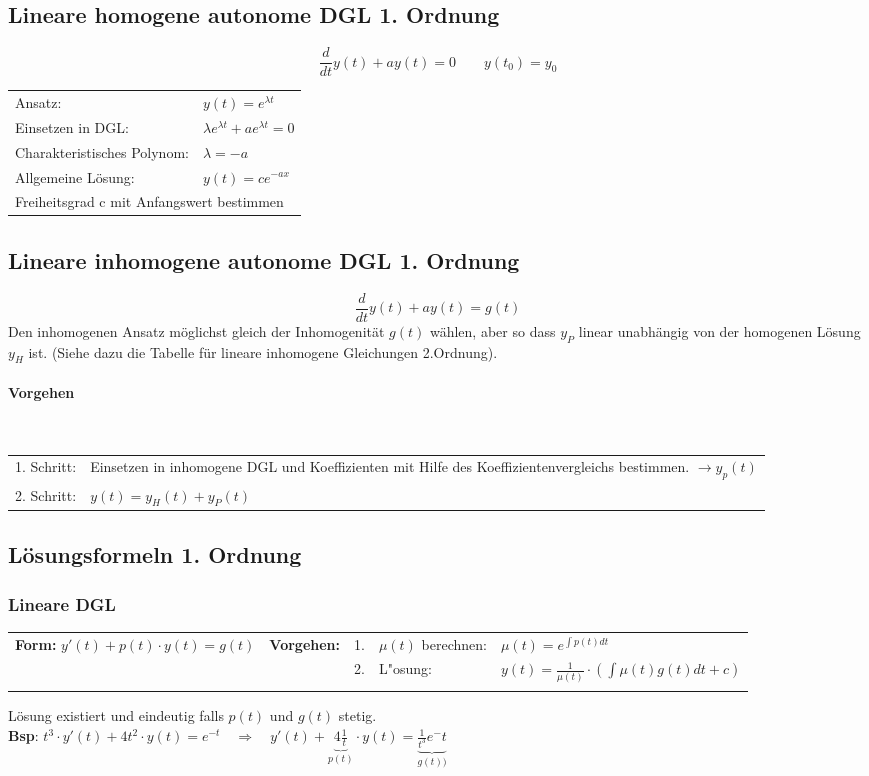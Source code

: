 \subsection{Lineare homogene autonome DGL 1. Ordnung}
\[ \dfrac{d}{dt}y(t)+ay(t)=0 \qquad y(t_0)=y_0 \]
\begin{tabular}{ll}
Ansatz: & $y(t) = e^{\lambda t}$\\
Einsetzen in DGL: & $\lambda e^{\lambda t} + ae^{\lambda t} = 0$\\
Charakteristisches Polynom: & $\lambda = -a$\\
Allgemeine Lösung: & $y(t) = ce^{-ax}$\\
\multicolumn{2}{l}{Freiheitsgrad c mit Anfangswert bestimmen} \\
\end{tabular}

\subsection{Lineare inhomogene autonome DGL 1. Ordnung}
\[ \dfrac{d}{dt}y(t)+ay(t) = g(t) \]
Den inhomogenen Ansatz möglichst gleich der Inhomogenität $g(t)$ wählen, aber so dass $y_P$ linear unabhängig von der homogenen Lösung $y_H$ ist. (Siehe dazu die Tabelle für lineare inhomogene Gleichungen 2.Ordnung). \\

\paragraph{Vorgehen}~\\
\begin{tabularx}{\linewidth}{lX}
1. Schritt: & Einsetzen in inhomogene DGL und Koeffizienten mit Hilfe des Koeffizientenvergleichs bestimmen. $\rightarrow y_p(t)$\\
2. Schritt: & $y(t) = y_H(t)+y_P(t)$ \\
\end{tabularx}


\newpage
\subsection{Lösungsformeln 1. Ordnung}
\subsubsection{Lineare DGL}
\begin{tabular}{p{6cm}p{2cm}p{0.2cm}p{3.8cm}p{6.5cm}}
\textbf{Form:} \quad $y'(t) + p(t) \cdot y(t) = g(t)$ &
\textbf{Vorgehen:} &
1. & $\mu(t)$ berechnen: & $\mu(t) = e^{\int p(t) dt}$ \\ &&
2. & L"osung: & $y(t) = \frac{1}{\mu(t)} \cdot ( \int \mu(t) g(t) dt +c)$ \\ &&
\end{tabular}
Lösung existiert und eindeutig falls $p(t)$ und $g(t)$ stetig.\\
\textbf{Bsp}: $t^3 \cdot y'(t) + 4 t^2 \cdot y(t) = e^{-t} \quad \Longrightarrow \quad y'(t) + \underbrace{4 \frac{1}{t}}_{p(t)} \cdot y(t) = \underbrace{\frac{1}{t^3} e^-t}_{g(t))}$

